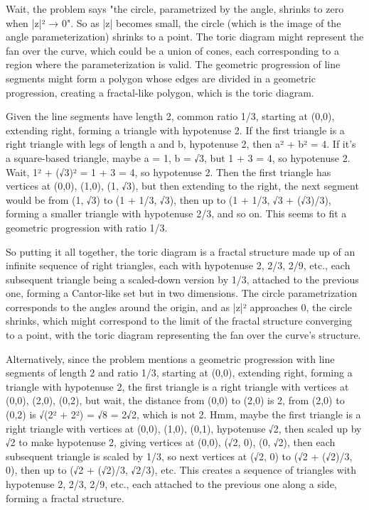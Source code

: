 Wait, the problem says "the circle, parametrized by the angle, shrinks to zero when |z|² → 0". So as |z| becomes small, the circle (which is the image of the angle parameterization) shrinks to a point. The toric diagram might represent the fan over the curve, which could be a union of cones, each corresponding to a region where the parameterization is valid. The geometric progression of line segments might form a polygon whose edges are divided in a geometric progression, creating a fractal-like polygon, which is the toric diagram.

Given the line segments have length 2, common ratio 1/3, starting at (0,0), extending right, forming a triangle with hypotenuse 2. If the first triangle is a right triangle with legs of length a and b, hypotenuse 2, then a² + b² = 4. If it's a square-based triangle, maybe a = 1, b = √3, but 1 + 3 = 4, so hypotenuse 2. Wait, 1² + (√3)² = 1 + 3 = 4, so hypotenuse 2. Then the first triangle has vertices at (0,0), (1,0), (1, √3), but then extending to the right, the next segment would be from (1, √3) to (1 + 1/3, √3), then up to (1 + 1/3, √3 + (√3)/3), forming a smaller triangle with hypotenuse 2/3, and so on. This seems to fit a geometric progression with ratio 1/3.

So putting it all together, the toric diagram is a fractal structure made up of an infinite sequence of right triangles, each with hypotenuse 2, 2/3, 2/9, etc., each subsequent triangle being a scaled-down version by 1/3, attached to the previous one, forming a Cantor-like set but in two dimensions. The circle parametrization corresponds to the angles around the origin, and as |z|² approaches 0, the circle shrinks, which might correspond to the limit of the fractal structure converging to a point, with the toric diagram representing the fan over the curve's structure.

Alternatively, since the problem mentions a geometric progression with line segments of length 2 and ratio 1/3, starting at (0,0), extending right, forming a triangle with hypotenuse 2, the first triangle is a right triangle with vertices at (0,0), (2,0), (0,2), but wait, the distance from (0,0) to (2,0) is 2, from (2,0) to (0,2) is √(2² + 2²) = √8 = 2√2, which is not 2. Hmm, maybe the first triangle is a right triangle with vertices at (0,0), (1,0), (0,1), hypotenuse √2, then scaled up by √2 to make hypotenuse 2, giving vertices at (0,0), (√2, 0), (0, √2), then each subsequent triangle is scaled by 1/3, so next vertices at (√2, 0) to (√2 + (√2)/3, 0), then up to (√2 + (√2)/3, √2/3), etc. This creates a sequence of triangles with hypotenuse 2, 2/3, 2/9, etc., each attached to the previous one along a side, forming a fractal structure.

